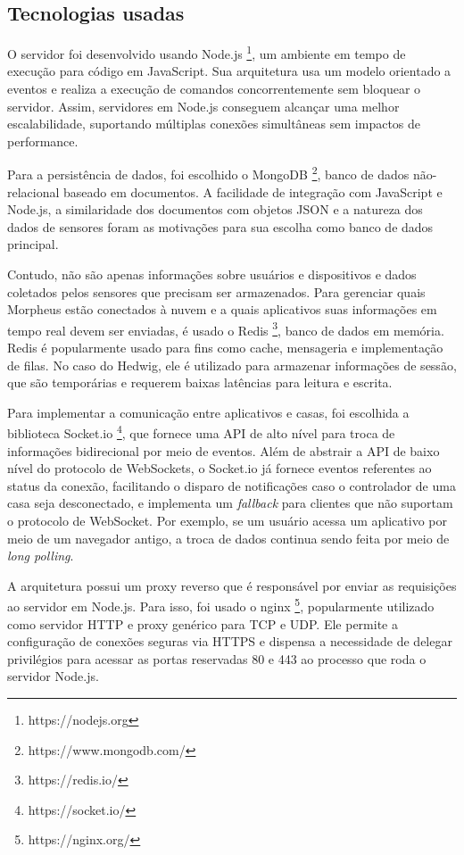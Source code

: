 \subsection{Tecnologias usadas}

O servidor foi desenvolvido usando Node.js \footnote{https://nodejs.org}, um ambiente em tempo de execução para código em JavaScript. Sua arquitetura usa um modelo orientado a eventos e realiza a execução de comandos concorrentemente sem bloquear o servidor. Assim, servidores em Node.js conseguem alcançar uma melhor escalabilidade, suportando múltiplas conexões simultâneas sem impactos de performance.

Para a persistência de dados, foi escolhido o MongoDB \footnote{https://www.mongodb.com/}, banco de dados não-relacional baseado em documentos. A facilidade de integração com JavaScript e Node.js, a similaridade dos documentos com objetos JSON e a natureza dos dados de sensores foram as motivações para sua escolha como banco de dados principal.

Contudo, não são apenas informações sobre usuários e dispositivos e dados coletados pelos sensores que precisam ser armazenados. Para gerenciar quais Morpheus estão conectados à nuvem e a quais aplicativos suas informações em tempo real devem ser enviadas, é usado o Redis \footnote{https://redis.io/}, banco de dados em memória. Redis é popularmente usado para fins como cache, mensageria e implementação de filas. No caso do Hedwig, ele é utilizado para armazenar informações de sessão, que são temporárias e requerem baixas latências para leitura e escrita.

Para implementar a comunicação entre aplicativos e casas, foi escolhida a biblioteca Socket.io \footnote{https://socket.io/}, que fornece uma API de alto nível para troca de informações bidirecional por meio de eventos. Além de abstrair a API de baixo nível do protocolo de WebSockets, o Socket.io já fornece eventos referentes ao status da conexão, facilitando o disparo de notificações caso o controlador de uma casa seja desconectado, e implementa um \emph{fallback} para clientes que não suportam o protocolo de WebSocket. Por exemplo, se um usuário acessa um aplicativo por meio de um navegador antigo, a troca de dados continua sendo feita por meio de \emph{long polling}.

A arquitetura possui um proxy reverso que é responsável por enviar as requisições ao servidor em Node.js. Para isso, foi usado o nginx \footnote{https://nginx.org/}, popularmente utilizado como servidor HTTP e proxy genérico para TCP e UDP. Ele permite a configuração de conexões seguras via HTTPS e dispensa a necessidade de delegar privilégios para acessar as portas reservadas 80 e 443 ao processo que roda o servidor Node.js.


